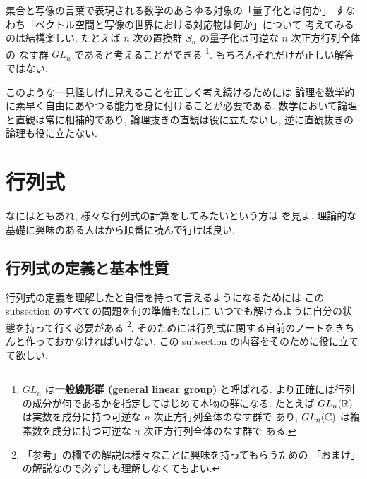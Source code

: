 \documentclass[12pt,twoside]{jarticle}
\begin{document}
集合と写像の言葉で表現される数学のあらゆる対象の「量子化とは何か」 
すなわち「ベクトル空間と写像の世界における対応物は何か」について
考えてみるのは結構楽しい.  
たとえば $n$ 次の置換群 $S_n$ の量子化は可逆な $n$ 次正方行列全体の
なす群 $GL_n$ であると考えることができる%
\footnote{$GL_n$ は{\bf 一般線形群 (general linear group)} と呼ばれる.
  より正確には行列の成分が何であるかを指定してはじめて本物の群になる.
  たとえば $GL_n({\mathbb R})$ は実数を成分に持つ可逆な $n$ 次正方行列全体のなす群で
  あり, $GL_n({\mathbb C})$ は複素数を成分に持つ可逆な $n$ 次正方行列全体のなす群で
  ある.}.
もちろんそれだけが正しい解答ではない.

このような一見怪しげに見えることを正しく考え続けるためには
論理を数学的に素早く自由にあやつる能力を身に付けることが必要である.
数学において論理と直観は常に相補的であり, 
論理抜きの直観は役に立たないし,
逆に直観抜きの論理も役に立たない.


\section{行列式}
\label{sec:det}

なにはともあれ, 様々な行列式の計算をしてみたいという方は
を見よ.
理論的な基礎に興味のある人はから順番に読んで行けば良い.


\subsection{行列式の定義と基本性質}
\label{sec:def-det}

行列式の定義を理解したと自信を持って言えるようになるためには
この subsection のすべての問題を何の準備もなしに
いつでも解けるように自分の状態を持って行く必要がある%
\footnote{「参考」の欄での解説は様々なことに興味を持ってもらうための
  「おまけ」の解説なので必ずしも理解しなくてもよい.}.
そのためには行列式に関する自前のノートをきちんと作っておかなければいけない.
この subsection の内容をそのために役に立てて欲しい.
\end{document}
